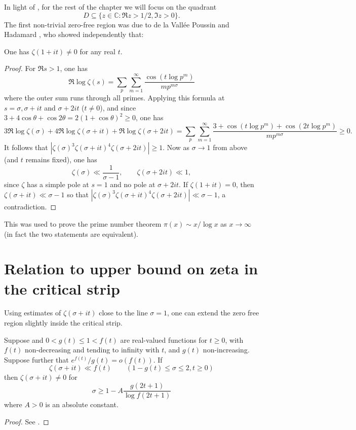 In light of , for the rest of the chapter we will focus on the quadrant 
\[
D\subseteq \{z \in \mathbb{C}: \Re z > 1/2, \Im z > 0\}.
\]
The first non-trivial zero-free region was due to de la Vall\'ee Poussin \cite{de_la_vallee_poussin_recherches_1896} and Hadamard \cite{hadamard_distribution_1896}, who showed independently that:


\begin{theorem}
One has $\zeta(1 + it) \ne 0$ for any real $t$.
\end{theorem}
\begin{proof}
For $\Re s > 1$, one has
\[
\Re \log \zeta(s) = \sum_{p}\sum_{m = 1}^{\infty}\frac{\cos (t \log p^m)}{mp^{m\sigma}}
\]
where the outer sum runs through all primes. Applying this formula at $s = \sigma, \sigma + it$ and $\sigma + 2it$ ($t \ne 0$), and since $3 + 4\cos\theta + \cos 2\theta = 2(1 + \cos\theta)^2 \ge 0$, one has
\[
3\Re \log \zeta(\sigma) + 4\Re \log \zeta(\sigma + it) + \Re\log \zeta(\sigma + 2it) = \sum_{p}\sum_{m = 1}^{\infty}\frac{3 + \cos (t \log p^m) + \cos (2t\log p^m)}{mp^{m\sigma}} \ge 0.
\]
It follows that $|\zeta(\sigma)^3 \zeta(\sigma + it)^4 \zeta(\sigma + 2it)| \ge 1$. Now as $\sigma \to 1$ from above (and $t$ remains fixed), one has
\[
\zeta(\sigma) \ll \frac{1}{\sigma - 1},\qquad \zeta(\sigma + 2it) \ll 1,
\]
since $\zeta$ has a simple pole at $s = 1$ and no pole at $\sigma + 2it$. If $\zeta(1 + it) = 0$, then $\zeta(\sigma + it) \ll \sigma - 1$ so that $|\zeta(\sigma)^3 \zeta(\sigma + it)^4 \zeta(\sigma + 2it)| \ll \sigma - 1$, a contradiction.
\end{proof}

This was used to prove the prime number theorem $\pi(x) \sim x/\log x$ as $x \to \infty$ (in fact the two statements are equivalent).

\section{Relation to upper bound on zeta in the critical strip}

Using estimates of $\zeta(\sigma + it)$ close to the line $\sigma = 1$, one can extend the zero free region slightly inside the critical strip. 

\begin{lemma}\label{mu_to_zero_free}
Suppose and $0 < g(t) \le 1 < f(t)$ are real-valued functions for $t \ge 0$, with $f(t)$ non-decreasing and tending to infinity with $t$, and $g(t)$ non-increasing. Suppose further that $e^{f(t)}/g(t) = o(f(t))$. If 
\[
\zeta(\sigma + it) \ll f(t)\qquad (1 - g(t) \le \sigma \le 2, t \ge 0)
\]
then $\zeta(\sigma + it) \ne 0$ for 
\[
\sigma \ge 1 - A\frac{g(2t + 1)}{\log f(2t + 1)}
\]
where $A > 0$ is an absolute constant. 
\end{lemma}
\begin{proof}
See \cite[Theorem 3.10]{titchmarsh_theory_1986}.
\end{proof}

